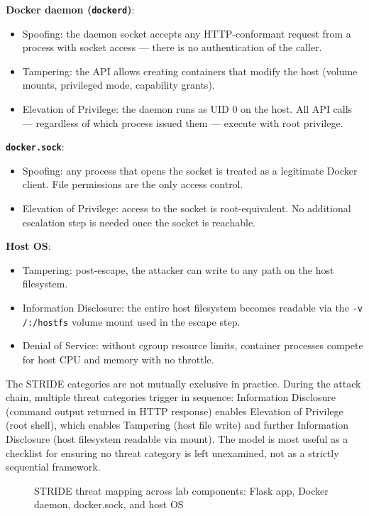 \textbf{Docker daemon (\texttt{dockerd})}:
\begin{itemize}
    \item Spoofing: the daemon socket accepts any HTTP-conformant request from a process with socket access --- there is no authentication of the caller.
    \item Tampering: the API allows creating containers that modify the host (volume mounts, privileged mode, capability grants).
    \item Elevation of Privilege: the daemon runs as UID 0 on the host. All API calls --- regardless of which process issued them --- execute with root privilege.
\end{itemize}

\textbf{\texttt{docker.sock}}:
\begin{itemize}
    \item Spoofing: any process that opens the socket is treated as a legitimate Docker client. File permissions are the only access control.
    \item Elevation of Privilege: access to the socket is root-equivalent. No additional escalation step is needed once the socket is reachable.
\end{itemize}

\textbf{Host OS}:
\begin{itemize}
    \item Tampering: post-escape, the attacker can write to any path on the host filesystem.
    \item Information Disclosure: the entire host filesystem becomes readable via the \texttt{-v /:/hostfs} volume mount used in the escape step.
    \item Denial of Service: without cgroup resource limits, container processes compete for host CPU and memory with no throttle.
\end{itemize}

The STRIDE categories are not mutually exclusive in practice. During the attack chain, multiple threat categories trigger in sequence: Information Disclosure (command output returned in HTTP response) enables Elevation of Privilege (root shell), which enables Tampering (host file write) and further Information Disclosure (host filesystem readable via mount). The model is most useful as a checklist for ensuring no threat category is left unexamined, not as a strictly sequential framework.

\begin{figure}[h]
\centering
\vspace{3cm}
\caption{STRIDE threat mapping across lab components: Flask app, Docker daemon, docker.sock, and host OS}
\end{figure}

